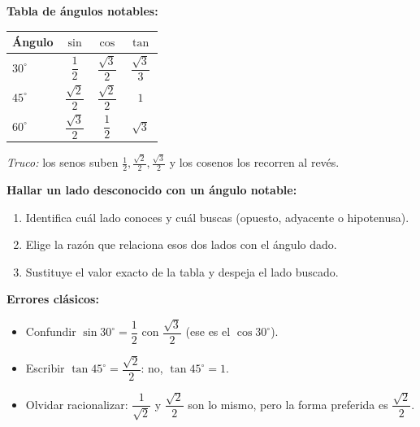 \documentclass[12pt, letterpaper]{article}
\providecommand{\sen}{\sin}
\begin{document}
\newpage %

\begin{cuadroteoria}
  \textbf{Tabla de ángulos notables:}
  \begin{center}
    \renewcommand{\arraystretch}{2.5} %
    \begin{tabular}{lccc}
      \toprule
      Ángulo       & $\sen$                & $\cos$                & $\tan$                \\
      \midrule
      $30^{\circ}$ & $\dfrac{1}{2}$        & $\dfrac{\sqrt{3}}{2}$ & $\dfrac{\sqrt{3}}{3}$ \\
      $45^{\circ}$ & $\dfrac{\sqrt{2}}{2}$ & $\dfrac{\sqrt{2}}{2}$ & $1$                   \\
      $60^{\circ}$ & $\dfrac{\sqrt{3}}{2}$ & $\dfrac{1}{2}$        & $\sqrt{3}$            \\
      \bottomrule
    \end{tabular}
  \end{center}
  \emph{Truco:} los senos suben $\frac{1}{2}, \frac{\sqrt{2}}{2}, \frac{\sqrt{3}}{2}$ y los cosenos los recorren al revés.
\end{cuadroteoria}

\begin{cuadropasos}
  \textbf{Hallar un lado desconocido con un ángulo notable:}
  \begin{enumerate}[leftmargin=*]
    \item Identifica cuál lado conoces y cuál buscas (opuesto, adyacente o hipotenusa).
    \item Elige la razón que relaciona esos dos lados con el ángulo dado.
    \item Sustituye el valor exacto de la tabla y despeja el lado buscado.
  \end{enumerate}
\end{cuadropasos}

\begin{cuadroadvertencia}
  \textbf{Errores clásicos:}
  \begin{itemize}[leftmargin=*]
    \item Confundir $\sen 30^{\circ} = \dfrac{1}{2}$ con $\dfrac{\sqrt{3}}{2}$ (ese es el $\cos 30^{\circ}$).
    \item Escribir $\tan 45^{\circ} = \dfrac{\sqrt{2}}{2}$: no, $\tan 45^{\circ} = 1$.
    \item Olvidar racionalizar: $\dfrac{1}{\sqrt{2}}$ y $\dfrac{\sqrt{2}}{2}$ son lo mismo, pero la forma preferida es $\dfrac{\sqrt{2}}{2}$.
  \end{itemize}
\end{cuadroadvertencia}
\end{document}
